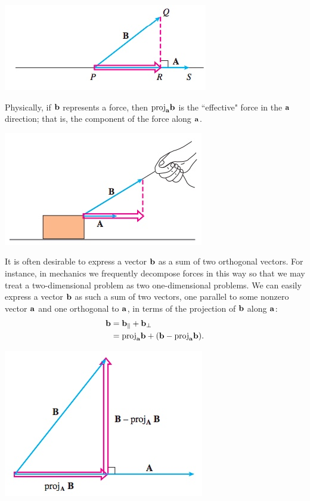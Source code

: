 \documentclass[12pt,letterpaper,reqno]{article}
\numberwithin{equation}{section}
\begin{document}
\begin{center}
	\includegraphics[scale=0.5]{figures_mvc/vector_projection_def}
\end{center}
Physically, if ${\bf b}$ represents a force, then $\text{proj}_{\bf a}{\bf b}$ is the 	``effective" force in the ${\bf a}$ direction; that is, the component of the force along ${\bf a}$.

\begin{center}
	\includegraphics[scale=0.5]{figures_mvc/effective_force_box}
\end{center}	

It is often desirable to express a vector ${\bf b}$ as a sum of two orthogonal vectors. For instance, in mechanics we frequently decompose forces in this way so that we may treat a two-dimensional problem as two one-dimensional problems. We can easily express a vector ${\bf b}$ as such a sum of two vectors, one parallel to some nonzero vector ${\bf a}$ and one orthogonal to ${\bf a}$, in terms of the projection of ${\bf b}$ along ${\bf a}$:
\begin{equation}
\begin{split}
	{\bf b}&={\bf b}_{\parallel}+{\bf b}_{\perp} \\
	&=\text{proj}_{\bf a}{\bf b}+({\bf b}-\text{proj}_{\bf a}{\bf b}).
\end{split}
\end{equation}

\begin{center}
	\includegraphics[scale=0.5]{figures_mvc/sum_of_orthogonal_vectors}
\end{center}
\end{document}
